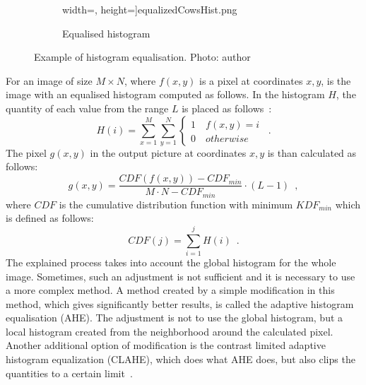 \documentclass[thesis=B,english]{FITthesis}[2019/12/23]
\begin{document}
\begin{figure}
\begin{subfigure}{0.39\linewidth}
                        width=\linewidth,
                        height=\histEqImagesHeight]{equalizedCowsHist.png}
                    \caption{Equalised histogram}
                    \label{subFig:equalizedCowsHist}
                \end{subfigure}
                \caption[Example of histogram equalisation]{Example of histogram equalisation. Photo: author}
                \label{fig:histogramEqualizing}
            \end{figure}
            
            For an image of size \(M\times N \), where \(f(x,y)\) is a pixel at coordinates \(x, y\), is the image with an equalised histogram computed as follows. In the histogram \(H\), the quantity of each value from the range \(L\) is placed as follows~\cite{X3IOSjMG1S81OB7w}:
            \begin{equation}
               H(i) = \sum_{x=1}^{M}\sum_{y=1}^{N}
                \begin{cases}
                    1\quad f(x,y) = i \\
                    0\quad otherwise
                \end{cases} \enspace .
            \end{equation} \label{eq::histogramCalculation}
            The pixel \(g(x, y)\) in the output picture at coordinates \(x, y\) is than calculated as follows:
            \begin{equation}
                g(x,y) = \frac{C\!DF(f(x,y)) - C\!DF_{min}}{M\cdot N - C\!DF_{min}} \cdot (L-1) \enspace ,
            \end{equation} \label{eq:equalizedImagePixel}
            where \(CDF\) is the cumulative distribution function with minimum \(KDF_{min}\) which is defined as follows:
            \begin{equation}
                CDF(j) = \sum_{i=1}^{j} H(i) \enspace .
            \end{equation} \label{eq:histogramKDF}
            The explained process takes into account the global histogram for the whole image. Sometimes, such an adjustment is not sufficient and it is necessary to use a more complex method. A method created by a simple modification in this method, which gives significantly better results, is called the adaptive histogram equalisation (AHE). The adjustment is not to use the global histogram, but a local histogram created from the neighborhood around the calculated pixel. Another additional option of modification is the contrast limited adaptive histogram equalization (CLAHE), which does what AHE does, but also clips the quantities to a certain limit~\cite{X3IOSjMG1S81OB7w}.
            
\end{document}
